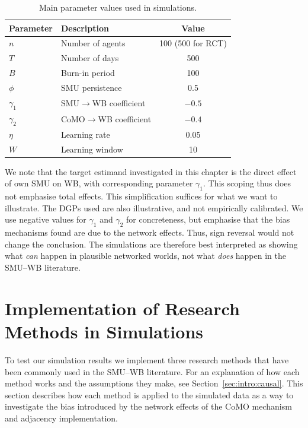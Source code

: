 \begin{table}[htbp]
\centering
\caption[Main parameter values used in simulations]{Main parameter values used in simulations.}
\label{tab:abm_main_params}
\begin{tabular}{llc}
\toprule
Parameter & Description & Value \\
\midrule
$n$ & Number of agents & 100 (500 for RCT) \\
$T$ & Number of days & 500 \\
$B$ & Burn-in period & 100 \\
$\phi$ & SMU persistence & 0.5 \\
$\gamma_1$ & SMU$\to$WB coefficient & $-0.5$ \\
$\gamma_2$ & CoMO$\to$WB coefficient & $-0.4$ \\
$\eta$ & Learning rate & 0.05 \\
$W$ & Learning window & 10 \\
\bottomrule
\end{tabular}
\end{table}

We note that the target estimand investigated in this chapter is the direct effect of own SMU on WB, with corresponding parameter $\gamma_1$. This scoping thus does not emphasise total effects. This simplification suffices for what we want to illustrate. The DGPs used are also illustrative, and not empirically calibrated. We use negative values for $\gamma_1$ and $\gamma_2$ for concreteness, but emphasise that the bias mechanisms found are due to the network effects. Thus, sign reversal would not change the conclusion. The simulations are therefore best interpreted as showing what \emph{can} happen in plausible networked worlds, not what \emph{does} happen in the SMU--WB literature.

\section{Implementation of Research Methods in Simulations}
\label{sec:abm:methods}
To test our simulation results we implement three research methods that have been commonly used in the SMU--WB literature. For an explanation of how each method works and the assumptions they make, see Section~\ref{sec:intro:causal}. This section describes how each method is applied to the simulated data as a way to investigate the bias introduced by the network effects of the CoMO mechanism and adjacency implementation.

